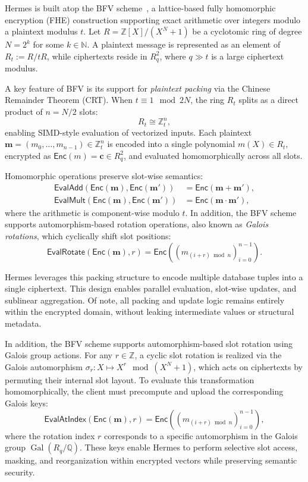 \documentclass[sigconf,nonacm]{acmart}
\begin{document}
Hermes is built atop the BFV scheme~\cite{FV2012}, a lattice-based fully homomorphic encryption (FHE) construction supporting exact arithmetic over integers modulo a plaintext modulus \( t \). Let \( R = \mathbb{Z}[X]/(X^N + 1) \) be a cyclotomic ring of degree \( N = 2^k \) for some \( k \in \mathbb{N} \). A plaintext message is represented as an element of \( R_t := R / tR \), while ciphertexts reside in \( R_q^2 \), where \( q \gg t \) is a large ciphertext modulus.

A key feature of BFV is its support for \emph{plaintext packing} via the Chinese Remainder Theorem (CRT). When \( t \equiv 1 \mod 2N \), the ring \( R_t \) splits as a direct product of \( n = N/2 \) slots:
\[
R_t \cong \mathbb{Z}_t^n,
\]
enabling SIMD-style evaluation of vectorized inputs. Each plaintext \( \mathbf{m} = (m_0, \dots, m_{n-1}) \in \mathbb{Z}_t^n \) is encoded into a single polynomial \( m(X) \in R_t \), encrypted as \( \mathsf{Enc}(m) = \mathbf{c} \in R_q^2 \), and evaluated homomorphically across all slots.

Homomorphic operations preserve slot-wise semantics:
\begin{align*}
\mathsf{EvalAdd}(\mathsf{Enc}(\mathbf{m}), \mathsf{Enc}(\mathbf{m'})) &= \mathsf{Enc}(\mathbf{m} + \mathbf{m'}), \\
\mathsf{EvalMult}(\mathsf{Enc}(\mathbf{m}), \mathsf{Enc}(\mathbf{m'})) &= \mathsf{Enc}(\mathbf{m} \cdot \mathbf{m'}),
\end{align*}
where the arithmetic is component-wise modulo \( t \). In addition, the BFV scheme supports automorphism-based rotation operations, also known as \emph{Galois rotations}, which cyclically shift slot positions:
\[
\mathsf{EvalRotate}(\mathsf{Enc}(\mathbf{m}), r) = \mathsf{Enc}((m_{(i+r) \bmod n})_{i=0}^{n-1}).
\]

Hermes leverages this packing structure to encode multiple database tuples into a single ciphertext. This design enables parallel evaluation, slot-wise updates, and sublinear aggregation. Of note, all packing and update logic remains entirely within the encrypted domain, without leaking intermediate values or structural metadata.

In addition, the BFV scheme supports automorphism-based slot rotation using Galois group actions. For any \( r \in \mathbb{Z} \), a cyclic slot rotation is realized via the Galois automorphism \( \sigma_r: X \mapsto X^r \mod (X^N + 1) \), which acts on ciphertexts by permuting their internal slot layout. To evaluate this transformation homomorphically, the client must precompute and upload the corresponding Galois keys:
\[
\mathsf{EvalAtIndex}(\mathsf{Enc}(\mathbf{m}), r) = \mathsf{Enc}((m_{(i+r)\bmod n})_{i=0}^{n-1}),
\]
where the rotation index \( r \) corresponds to a specific automorphism in the Galois group \( \operatorname{Gal}(R_q / \mathbb{Q}) \). These keys enable Hermes to perform selective slot access, masking, and reorganization within encrypted vectors while preserving semantic security.
\end{document}
